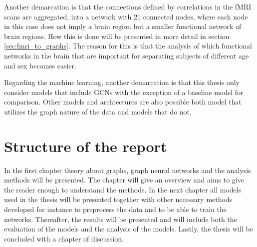 Another demarcation is that the connections defined by correlations in the fMRI scans are aggregated, into a network with 21 connected nodes, where each node in this case does not imply a brain region but a smaller functional network of brain regions. How this is done will be presented in more detail in section \ref{sec:fmri_to_graphs}. The reason for this is that the analysis of which functional networks in the brain that are important for separating subjects of different age and sex becomes easier. 

Regarding the machine learning, another demarcation is that this thesis only consider models that include GCNs with the exception of a baseline model for comparison. Other models and archtectures are also possible both model that utilizes the graph nature of the data and models that do not.



\section{Structure of the report}
In the first chapter theory about graphs, graph neural networks and the analysis methods will be presented. The chapter will give an overview and aims to give the reader enough to understand the methods. In the next chapter all models used in the thesis will be presented together with other necessary methods developed for instance to preprocess the data
and to be able to train the networks. Thereafter, the results will be presented and will include both the evaluation of the models and the analysis of the models. Lastly, the thesis will be concluded with a chapter of discussion. 

